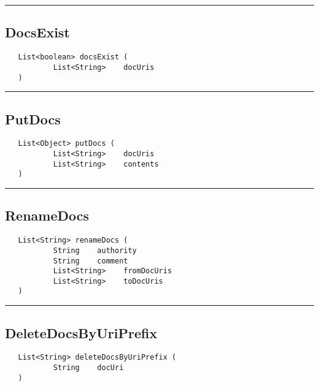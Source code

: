 \rule{15cm}{2pt}
\subsection{DocsExist}
\label{Api:DocsExist}
\begin{verbatim}
   List<boolean> docsExist (
           List<String>    docUris
   )
\end{verbatim}



\rule{15cm}{2pt}
\subsection{PutDocs}
\label{Api:PutDocs}
\begin{verbatim}
   List<Object> putDocs (
           List<String>    docUris
           List<String>    contents
   )
\end{verbatim}



\rule{15cm}{2pt}
\subsection{RenameDocs}
\label{Api:RenameDocs}
\begin{verbatim}
   List<String> renameDocs (
           String    authority
           String    comment
           List<String>    fromDocUris
           List<String>    toDocUris
   )
\end{verbatim}



\rule{15cm}{2pt}
\subsection{DeleteDocsByUriPrefix}
\label{Api:DeleteDocsByUriPrefix}
\begin{verbatim}
   List<String> deleteDocsByUriPrefix (
           String    docUri
   )
\end{verbatim}



